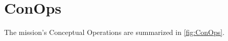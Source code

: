 \section{ConOps}
\label{sec:conops}

The mission's Conceptual Operations are summarized in \autoref{fig:ConOps}.

